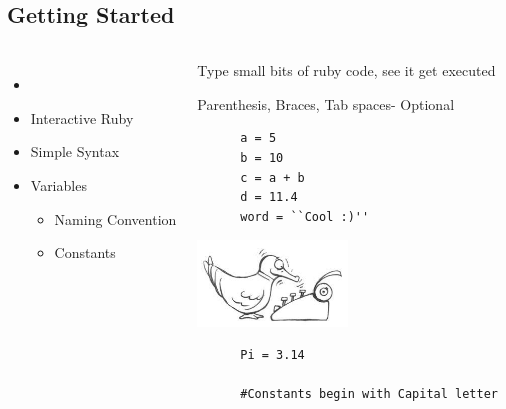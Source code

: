 \documentclass[xcolor=svgnames]{beamer}
\begin{document}
\subsection{Getting Started}
\begin{frame}[fragile]
\transwipe
\begin{columns}[c]	
  \column{1.5in}
\begin{itemize}
  \item[] \alert<+>{}
  \vfill\item \alert<+>{Interactive Ruby}
  \vfill\item \alert<+>{Simple Syntax}
  \vfill\item \alert<+>{Variables}
    \begin{itemize}
      \vfill\item \alert<+>{Naming Convention}
    \vfill\item \alert<+>{Constants}
    \end{itemize}

\end{itemize}
\column{2.5in}
  \begin{overprint}
    \begin{block}
      {Type small bits of ruby code, see it get executed}
   \end{block}
    \begin{block}
      {Parenthesis, Braces, Tab spaces- Optional}
    \end{block}
    \begin{verbatim}
      a = 5
      b = 10
      c = a + b
      d = 11.4
      word = ``Cool :)''
    \end{verbatim}
    \includegraphics[width=0.5\textwidth]{duck.jpg}
    \begin{verbatim}
      Pi = 3.14

      #Constants begin with Capital letter
    	
    \end{verbatim}
    \end{overprint}
\end{columns}
\end{frame}
\end{document}
